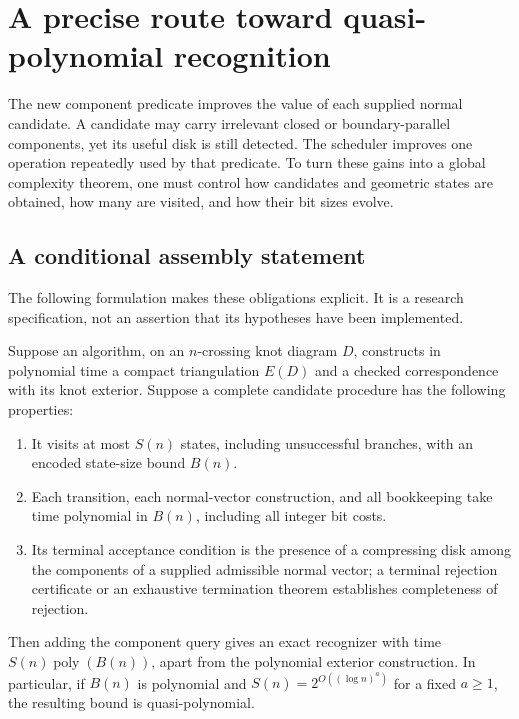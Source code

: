 \section{A precise route toward quasi-polynomial recognition}
\label{sec:research}

The new component predicate improves the value of each supplied normal
candidate.  A candidate may carry irrelevant closed or boundary-parallel
components, yet its useful disk is still detected.  The scheduler improves
one operation repeatedly used by that predicate.  To turn these gains into
a global complexity theorem, one must control how candidates and geometric
states are obtained, how many are visited, and how their bit sizes evolve.

\subsection{A conditional assembly statement}

The following formulation makes these obligations explicit.  It is a
research specification, not an assertion that its hypotheses have been
implemented.

\begin{proposition}
\label{prop:conditional-recognition}
Suppose an algorithm, on an $n$-crossing knot diagram $D$, constructs in
polynomial time a compact triangulation $E(D)$ and a checked correspondence
with its knot exterior.  Suppose a complete candidate procedure has the
following properties:
\begin{enumerate}
\item It visits at most $S(n)$ states, including unsuccessful branches, with
an encoded state-size bound $B(n)$.
\item Each transition, each normal-vector construction, and all bookkeeping
take time polynomial in $B(n)$, including all integer bit costs.
\item Its terminal acceptance condition is the presence of a compressing
disk among the components of a supplied admissible normal vector; a terminal
rejection certificate or an exhaustive termination theorem establishes
completeness of rejection.
\end{enumerate}
Then adding the component query gives an exact recognizer with time
$S(n)\operatorname{poly}(B(n))$, apart from the polynomial exterior
construction.  In particular, if $B(n)$ is polynomial and
$S(n)=2^{O((\log n)^a)}$ for a fixed $a\geq1$, the resulting bound is
quasi-polynomial.
\end{proposition}

